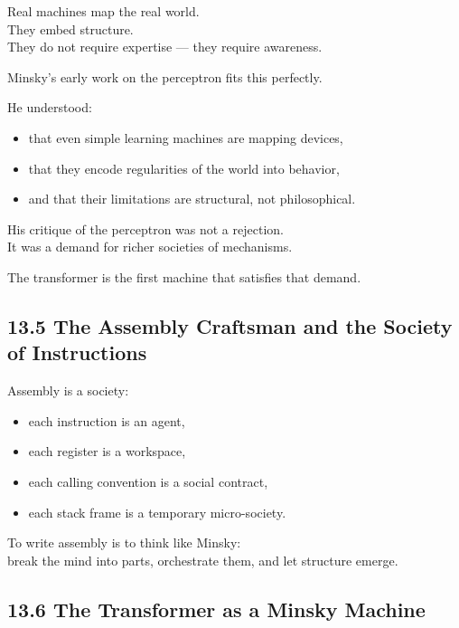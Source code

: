 \documentclass[
]{article}
\providecommand{\tightlist}{%
  \setlength{\itemsep}{0pt}\setlength{\parskip}{0pt}}
\begin{document}
Real machines map the real world.\\
They embed structure.\\
They do not require expertise --- they require awareness.

Minsky's early work on the perceptron fits this perfectly.

He understood:

\begin{itemize}
\tightlist
\item
  that even simple learning machines are mapping devices,
\item
  that they encode regularities of the world into behavior,
\item
  and that their limitations are structural, not philosophical.
\end{itemize}

His critique of the perceptron was not a rejection.\\
It was a demand for richer societies of mechanisms.

The transformer is the first machine that satisfies that demand.

\hypertarget{the-assembly-craftsman-and-the-society-of-instructions}{%
\subsection{13.5 The Assembly Craftsman and the Society of
Instructions}\label{the-assembly-craftsman-and-the-society-of-instructions}}

Assembly is a society:

\begin{itemize}
\tightlist
\item
  each instruction is an agent,
\item
  each register is a workspace,
\item
  each calling convention is a social contract,
\item
  each stack frame is a temporary micro-society.
\end{itemize}

To write assembly is to think like Minsky:\\
break the mind into parts, orchestrate them, and let structure emerge.

\hypertarget{the-transformer-as-a-minsky-machine}{%
\subsection{13.6 The Transformer as a Minsky
Machine}\label{the-transformer-as-a-minsky-machine}}
\end{document}
